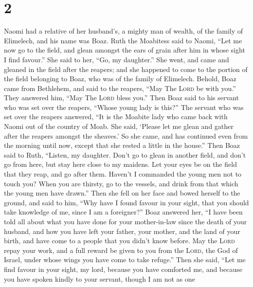 \hypertarget{section-1}{%
\section{2}\label{section-1}}

 Naomi had a relative of her husband's, a mighty man of
wealth, of the family of Elimelech, and his name was Boaz.
 Ruth the Moabitess said to Naomi, ``Let me now go to the
field, and glean amongst the ears of grain after him in whose sight I
find favour.'' She said to her, ``Go, my daughter.''  She
went, and came and gleaned in the field after the reapers; and she
happened to come to the portion of the field belonging to Boaz, who was
of the family of Elimelech.  Behold, Boaz came from
Bethlehem, and said to the reapers, ``May The \textsc{Lord} be with
you.'' They answered him, ``May The \textsc{Lord} bless you.''
 Then Boaz said to his servant who was set over the
reapers, ``Whose young lady is this?''  The servant who
was set over the reapers answered, ``It is the Moabite lady who came
back with Naomi out of the country of Moab.  She said,
`Please let me glean and gather after the reapers amongst the sheaves.'
So she came, and has continued even from the morning until now, except
that she rested a little in the house.''  Then Boaz said
to Ruth, ``Listen, my daughter. Don't go to glean in another field, and
don't go from here, but stay here close to my maidens. 
Let your eyes be on the field that they reap, and go after them. Haven't
I commanded the young men not to touch you? When you are thirsty, go to
the vessels, and drink from that which the young men have drawn.''
 Then she fell on her face and bowed herself to the
ground, and said to him, ``Why have I found favour in your sight, that
you should take knowledge of me, since I am a foreigner?''
 Boaz answered her, ``I have been told all about what you
have done for your mother-in-law since the death of your husband, and
how you have left your father, your mother, and the land of your birth,
and have come to a people that you didn't know before. 
May the \textsc{Lord} repay your work, and a full reward be given to you
from the \textsc{Lord}, the God of Israel, under whose wings you have
come to take refuge.''  Then she said, ``Let me find
favour in your sight, my lord, because you have comforted me, and
because you have spoken kindly to your servant, though I am not as one
